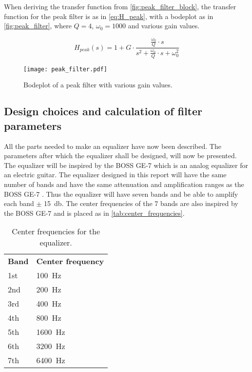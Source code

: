 When deriving the transfer function from \autoref{fig:peak_filter_block}, the transfer function for the peak filter is as in \autoref{eq:H_peak}, with a bodeplot as in \autoref{fig:peak_filter}, where $Q = 4$, $\omega_0 = 1000$ and various gain values. 

\begin{equation}\label{eq:H_peak}
        H_{peak}(s) = 1+G \cdot \frac{\frac{\omega_0}{Q}\cdot s}{s^2+\frac{\omega_0}{Q}\cdot s + \omega_0^2}
    \end{equation}
    
    \startexplain
    \stopexplain

\begin{figure}[!h]
    \centering
        \texttt{[image: peak\_filter.pdf]}
        \caption{Bodeplot of a peak filter with various gain values.}
        \label{fig:peak_filter}
  \end{figure} 
  
\subsection{Design choices and calculation of filter parameters}
All the parts needed to make an equalizer have now been described. The parameters after which the equalizer shall be designed, will now be presented. 
The equalizer will be inspired by the BOSS GE-7 which is an analog equalizer for an electric guitar. The equalizer designed in this report will have the same number of bands and have the same attenuation and amplification ranges as the BOSS GE-7 \citep{Boss_GE7}. Thus the equalizer will have seven bands and be able to amplify each band $\pm$ \SI{15}{\decibel}.
The center frequencies of the 7 bands are also inspired by the BOSS GE-7 and is placed as in \autoref{tab:center_frequencies}.

\begin{table}[htbp]
\centering
\caption{Center frequencies for the equalizer.}
\label{tab:center_frequencies}
\begin{tabular}{|l|l|}
\cline{1-2}
\textbf{Band} & \textbf{Center frequency} \\ \cline{1-2}
1st & \SI{100}{\hertz} \\  \cline{1-2}
2nd & \SI{200}{\hertz}\\ \cline{1-2}
3rd & \SI{400}{\hertz} \\ \cline{1-2}
4th & \SI{800}{\hertz} \\ \cline{1-2}
5th & \SI{1600}{\hertz} \\ \cline{1-2}
6th & \SI{3200}{\hertz} \\ \cline{1-2}
7th & \SI{6400}{\hertz} \\ \cline{1-2}
\end{tabular}
\end{table}

